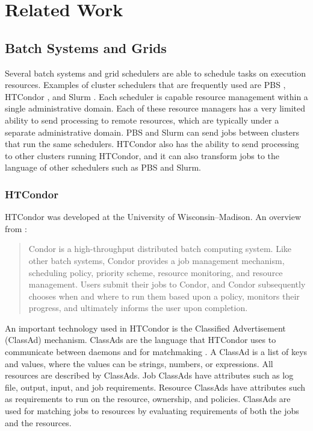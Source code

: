 \chapter{Related Work}
\label{chapter:relatedwork}

\section{Batch Systems and Grids}


Several batch systems and grid schedulers are able to schedule tasks on execution resources.  Examples of cluster schedulers that are frequently used are PBS \cite{pbstorque}, \mbox{HTCondor} \cite{litzkow1988condor}, and Slurm \cite{yoo2003slurm}.  Each scheduler is capable resource management within a single administrative domain.  Each of these resource managers has a very limited ability to send processing to remote resources, which are typically under a separate administrative domain.  PBS and Slurm can send jobs between clusters that run the same schedulers.  HTCondor also has the ability to send processing to other clusters running HTCondor, and it can also transform jobs to the language of other schedulers such as PBS and Slurm.

\subsection{HTCondor}
HTCondor was developed at the University of Wisconsin--Madison.  An overview from \cite{thain2005distributed}:
\begin{quotation}
	Condor is a high-throughput distributed batch computing system.  Like other batch systems, Condor provides a job management mechanism, scheduling policy, priority scheme, resource monitoring, and resource management.  Users submit their jobs to Condor, and Condor subsequently chooses when and where to run them based upon a policy, monitors their progress, and ultimately informs the user upon completion.  
\end{quotation}

An important technology used in HTCondor is the Classified Advertisement (\mbox{ClassAd}) mechanism.  ClassAds are the language that HTCondor uses to communicate between daemons and for matchmaking \cite{raman1998matchmaking}.  A ClassAd is a list of keys and values, where the values can be strings, numbers, or expressions.  All resources are described by ClassAds.  Job ClassAds have attributes such as log file, output, input, and job requirements.  Resource ClassAds have attributes such as  requirements to run on the resource, ownership, and policies.  ClassAds are used for matching jobs to resources by evaluating requirements of both the jobs and the resources.

